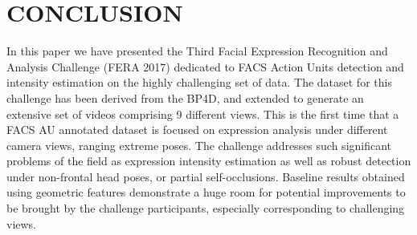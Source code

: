 \documentclass[a4paper, 10pt, conference]{ieeeconf}      \usepackage{FG2017}
\begin{document}
\section{CONCLUSION}
\noindent In this paper we have presented the Third Facial Expression Recognition and Analysis Challenge (FERA 2017) dedicated to FACS Action Units detection and intensity estimation on the highly challenging set of data. The dataset for this challenge has been derived from the BP4D, and extended to generate an extensive set of videos comprising 9 different views. This is the first time that a FACS AU annotated dataset is focused on expression analysis under different camera views, ranging extreme poses. The challenge addresses such significant problems of the field as expression intensity estimation as well as robust detection under non-frontal head poses, or partial self-occlusions. Baseline results obtained using geometric features demonstrate a huge room for potential improvements to be brought by the challenge participants, especially corresponding to challenging views.   
\end{document}

